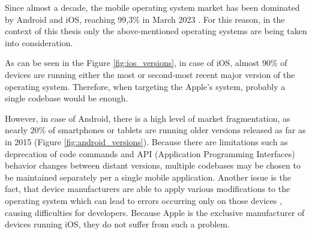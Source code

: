 Since almost a decade, the mobile operating system market has been dominated by Android and iOS, reaching 99,3\% in March 2023 \cite{statcounter_mobile_os_market}. For this reason, in the context of this thesis only the above-mentioned operating systems are being taken into consideration.

As can be seen in the Figure \ref{fig:ios_versions}, in case of iOS, almost 90\% of devices are running either the most or second-most recent major version of the operating system. Therefore, when targeting the Apple's system, probably a single codebase would be enough.

However, in case of Android, there is a high level of market fragmentation, as nearly 20\% of smartphones or tablets are running older versions released as far as in 2015 (Figure \ref{fig:android_versions}). Because there are limitations such as deprecation of code commands and API (Application Programming Interfaces) behavior changes between distant versions, multiple codebases may be chosen to be maintained separately per a single mobile application. Another issue is the fact, that device manufacturers are able to apply various modifications to the operating system which can lead to errors occurring only on those devices \cite{comparison_technologies_multiplatform}, causing difficulties for developers. Because Apple is the exclusive manufacturer of devices running iOS, they do not suffer from such a problem. 

